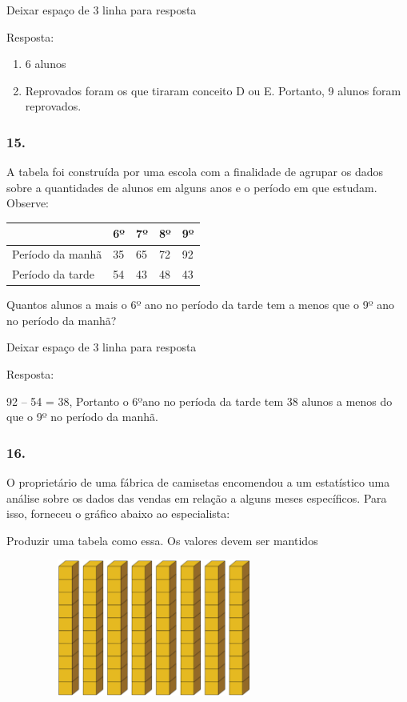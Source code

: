 Deixar espaço de 3 linha para resposta

Resposta:

\begin{enumerate}
\def\labelenumi{\alph{enumi})}
\item
  6 alunos
\item
  Reprovados foram os que tiraram conceito D ou E. Portanto, 9 alunos
  foram reprovados.
\end{enumerate}

\subsubsection{15.}\label{section-121}

A tabela foi construída por uma escola com a finalidade de agrupar os
dados sobre a quantidades de alunos em alguns anos e o período em que
estudam. Observe:

\begin{longtable}[]{@{}lllll@{}}
\toprule
& 6º & 7º & 8º & 9º\tabularnewline
\midrule
\endhead
Período da manhã & 35 & 65 & 72 & 92\tabularnewline
Período da tarde & 54 & 43 & 48 & 43\tabularnewline
\bottomrule
\end{longtable}

Quantos alunos a mais o 6º ano no período da tarde tem a menos que o 9º
ano no período da manhã?

Deixar espaço de 3 linha para resposta

Resposta:

92 -- 54 = 38, Portanto o 6ºano no períoda da tarde tem 38 alunos a
menos do que o 9º no período da manhã.

\subsubsection{16.}\label{section-122}

O proprietário de uma fábrica de camisetas encomendou a um estatístico
uma análise sobre os dados das vendas em relação a alguns meses
específicos. Para isso, forneceu o gráfico abaixo ao especialista:

Produzir uma tabela como essa. Os valores devem ser mantidos

\includegraphics[width=3.82692in,height=1.76423in]{media/image103.png}

